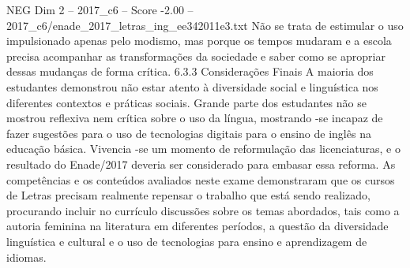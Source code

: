 \begin{textsample}{NEG Dim 2 – 2017\_c6 – Score -2.00 – 2017\_c6/enade\_2017\_letras\_ing\_ee342011e3.txt}
Não se trata de estimular o uso impulsionado apenas pelo modismo, mas porque os tempos mudaram e a escola precisa acompanhar as transformações da sociedade e saber como se apropriar dessas mudanças de forma crítica. 6.3.3 Considerações Finais A maioria dos estudantes demonstrou não estar atento à diversidade social e linguística nos diferentes contextos e práticas sociais.
Grande parte dos estudantes não se mostrou reflexiva nem crítica sobre o uso da língua, mostrando -se incapaz de fazer sugestões para o uso de tecnologias digitais para o ensino de inglês na educação básica.
Vivencia -se um momento de reformulação das licenciaturas, e o resultado do Enade/2017 deveria ser considerado para embasar essa reforma.
As competências e os conteúdos avaliados neste exame demonstraram que os cursos de Letras precisam realmente repensar o trabalho que está sendo realizado, procurando incluir no currículo discussões sobre os temas abordados, tais como a autoria feminina na literatura em diferentes períodos, a questão da diversidade linguística e cultural e o uso de tecnologias para ensino e aprendizagem de idiomas.

\end{textsample}
